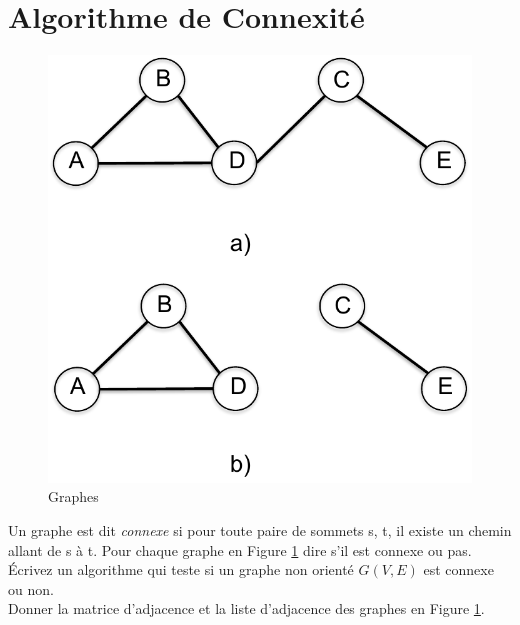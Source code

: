 \documentclass{article}[12pt]
\begin{document}
\section*{Algorithme de Connexité}
\begin{figure}[hbtp] 
  \centering
\includegraphics[scale =0.5] {grapheConnexe.pdf} \caption{Graphes} \label{fig:grapheConnexe}
\end{figure}

Un graphe est dit \emph{connexe} si pour toute paire de sommets s, t, il existe un chemin allant de s à t. Pour chaque graphe en Figure \ref{fig:grapheConnexe} dire s'il est connexe ou pas. Écrivez un algorithme qui teste si un graphe non orienté $G(V,E)$ est connexe ou non. \\ Donner la matrice d'adjacence et la liste d'adjacence des graphes en Figure \ref{fig:grapheConnexe}.
\end{document}
